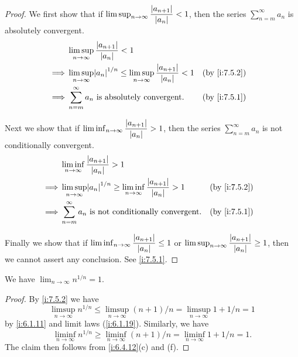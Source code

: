 \begin{proof}
  We first show that if \(\limsup_{n \to \infty} \dfrac{\left\lvert a_{n + 1}\right\rvert}{\left\lvert a_n\right\rvert} < 1\), then the series \(\sum_{n = m}^\infty a_n\) is absolutely convergent.
  \begin{align*}
             & \limsup_{n \to \infty} \dfrac{\abs{a_{n + 1}}}{\abs{a_n}} < 1                                                                 \\
    \implies & \limsup_{n \to \infty} \abs{a_n}^{1 / n} \leq \limsup_{n \to \infty} \dfrac{\abs{a_{n + 1}}}{\abs{a_n}} < 1 &  & \by{i:7.5.2} \\
    \implies & \sum_{n = m}^\infty a_n \text{ is absolutely convergent}.                                                   &  & \by{i:7.5.1}
  \end{align*}

  Next we show that if \(\liminf_{n \to \infty} \dfrac{\left\lvert a_{n + 1}\right\rvert}{\left\lvert a_n\right\rvert} > 1\), then the series \(\sum_{n = m}^\infty a_n\) is not conditionally convergent.
  \begin{align*}
             & \liminf_{n \to \infty} \dfrac{\abs{a_{n + 1}}}{\abs{a_n}} > 1                                                                 \\
    \implies & \limsup_{n \to \infty} \abs{a_n}^{1 / n} \geq \liminf_{n \to \infty} \dfrac{\abs{a_{n + 1}}}{\abs{a_n}} > 1 &  & \by{i:7.5.2} \\
    \implies & \sum_{n = m}^\infty a_n \text{ is not conditionally convergent}.                                            &  & \by{i:7.5.1}
  \end{align*}

  Finally we show that if \(\liminf_{n \to \infty} \dfrac{\left\lvert a_{n + 1}\right\rvert}{\left\lvert a_n\right\rvert} \leq 1\) or \(\limsup_{n \to \infty} \dfrac{\left\lvert a_{n + 1}\right\rvert}{\left\lvert a_n\right\rvert} \geq 1\), then we cannot assert any conclusion.
  See \cref{i:7.5.1}.
\end{proof}

\begin{prop}\label{i:7.5.4}
  We have \(\lim_{n \to \infty} n^{1 / n} = 1\).
\end{prop}

\begin{proof}
  By \cref{i:7.5.2} we have
  \[
    \limsup_{n \to \infty} n^{1 / n} \leq \limsup_{n \to \infty} (n + 1) / n = \limsup_{n \to \infty} 1 + 1 / n = 1
  \]
  by \cref{i:6.1.11} and limit laws (\cref{i:6.1.19}).
  Similarly, we have
  \[
    \liminf_{n \to \infty} n^{1 / n} \geq \liminf_{n \to \infty} (n + 1) / n = \liminf_{n \to \infty} 1 + 1 / n = 1.
  \]
  The claim then follows from \cref{i:6.4.12}(c) and (f).
\end{proof}

